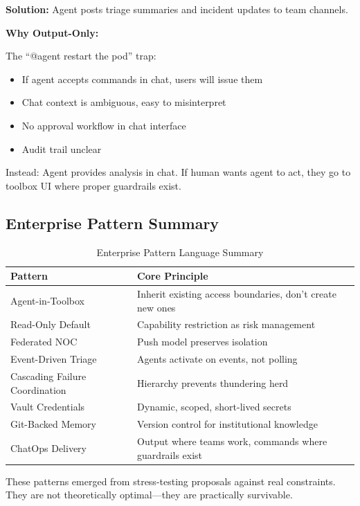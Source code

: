 \textbf{Solution:} Agent posts triage summaries and incident updates to team channels.

\textbf{Why Output-Only:}

The ``@agent restart the pod'' trap:
\begin{itemize}
    \item If agent accepts commands in chat, users will issue them
    \item Chat context is ambiguous, easy to misinterpret
    \item No approval workflow in chat interface
    \item Audit trail unclear
\end{itemize}

Instead: Agent provides analysis in chat. If human wants agent to act, they go to toolbox UI where proper guardrails exist.

\subsection{Enterprise Pattern Summary}
\label{subsec:pattern-summary}

\begin{table}[htbp]
\centering
\caption{Enterprise Pattern Language Summary}
\label{tab:enterprise-patterns}
\begin{tabular}{ll}
\toprule
\textbf{Pattern} & \textbf{Core Principle} \\
\midrule
Agent-in-Toolbox & Inherit existing access boundaries, don't create new ones \\
Read-Only Default & Capability restriction as risk management \\
Federated NOC & Push model preserves isolation \\
Event-Driven Triage & Agents activate on events, not polling \\
Cascading Failure Coordination & Hierarchy prevents thundering herd \\
Vault Credentials & Dynamic, scoped, short-lived secrets \\
Git-Backed Memory & Version control for institutional knowledge \\
ChatOps Delivery & Output where teams work, commands where guardrails exist \\
\bottomrule
\end{tabular}
\end{table}

These patterns emerged from stress-testing proposals against real constraints. They are not theoretically optimal---they are practically survivable.

